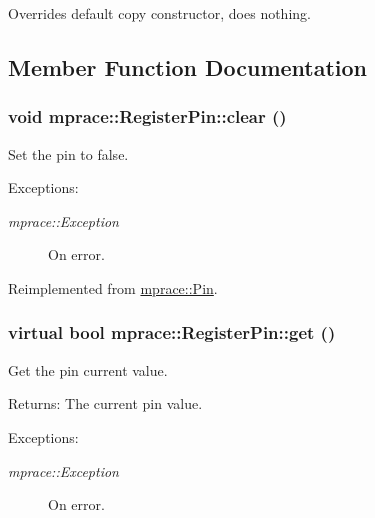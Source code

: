Overrides default copy constructor, does nothing. 



\subsection{Member Function Documentation}
\hypertarget{classmprace_1_1RegisterPin_a5}{
\subsubsection[clear]{\setlength{\rightskip}{0pt plus 5cm}void mprace::Register\-Pin::clear ()}}
\label{classmprace_1_1RegisterPin_a5}


Set the pin to false. 

\begin{Desc}
\item[Exceptions:]
\begin{description}
\item[{\em mprace::Exception}]On error.\end{description}
\end{Desc}


Reimplemented from \hyperlink{classmprace_1_1Pin_a4}{mprace::Pin}.\hypertarget{classmprace_1_1RegisterPin_a3}{
\subsubsection[get]{\setlength{\rightskip}{0pt plus 5cm}virtual bool mprace::Register\-Pin::get ()}}
\label{classmprace_1_1RegisterPin_a3}


Get the pin current value. 

\begin{Desc}
\item[Returns:]The current pin value. \end{Desc}
\begin{Desc}
\item[Exceptions:]
\begin{description}
\item[{\em mprace::Exception}]On error.\end{description}
\end{Desc}


